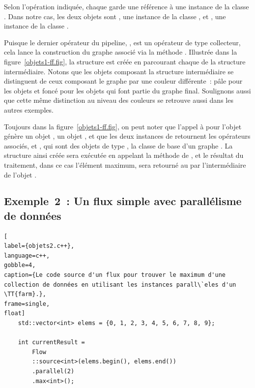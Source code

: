 Selon l'opération indiquée, chaque  garde une r\'ef\'erence \`a une instance de la classe . Dans notre cas, les deux objets  sont , une instance de la classe , et , une instance de la classe . 



Puisque le dernier op\'erateur du {pipeline}, , est un op\'erateur de type collecteur, cela lance la construction du graphe  associ\'e via la m\'ethode . Illustr\'ee dans la figure~\ref{objets1-ff.fig}, la structure  est cr\'e\'ee en parcourant chaque  de la structure interm\'ediaire. 
%
Notons que les objets composant la structure interm\'ediaire se distinguent de ceux composant le graphe  par une couleur diff\'erente~: p\^ale pour les objets  et fonc\'e pour les objets qui font partie du graphe  final. Soulignons aussi que cette même distinction au niveau des couleurs se retrouve aussi dans les autres exemples. 

Toujours dans la figure~\ref{objets1-ff.fig}, on peut noter que l'appel à  pour l'objet  g\'en\`ere un objet , un objet , et que les deux instances de  retournent les op\'erateurs associés,  et , qui sont des objets de type , la classe de base d'un graphe . La structure ainsi cr\'e\'ee sera ex\'ecut\'ee en appelant la méthode  de , et le r\'esultat du traitement, dans ce cas l'élément maximum, sera retourn\'e au  par l'interm\'ediaire de l'objet . 

 
\subsection{Exemple~2~: Un flux simple avec parallélisme de données}

\begin{lstlisting}[
label={objets2.c++},
language=c++,
gobble=4,
caption={Le code source d'un flux pour trouver le maximum d'une collection de données en utilisant les instances parall\`eles d'un \TT{farm}.},
frame=single,
float]
    std::vector<int> elems = {0, 1, 2, 3, 4, 5, 6, 7, 8, 9};

    int currentResult =
        Flow
        ::source<int>(elems.begin(), elems.end())
        .parallel(2)
        .max<int>();
\end{lstlisting}



